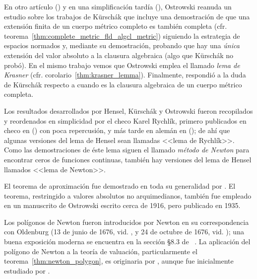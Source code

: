 \documentclass[teoria-numeros.tex]{subfiles}
\begin{document}
En otro artículo \cite{ostrowski:fragen} (\citeyear{ostrowski:fragen}) y en una simplificación tardía \cite{ostrowski:perfekte} (\citeyear{ostrowski:perfekte}),
Ostrowski reanuda un estudio sobre los trabajos de Kürschák que incluye una demostración de que una extensión finita de un cuerpo métrico completo
es también completa (cfr. teorema~\ref{thm:complete_metric_fld_algcl_metric}) siguiendo la estrategia de espacios normados y, mediante su demostración,
probando que hay una \textit{única} extensión del valor absoluto a la clausura algebraica (algo que Kürschák no probó).
En el mismo trabajo vemos que Ostrowski emplea el llamado \textit{lema de Krasner} (cfr. corolario~\ref{thm:krasner_lemma}).
Finalmente, respondió a la duda de Kürschák respecto a cuando es la clausura algebraica de un cuerpo métrico completa.

Los resultados desarrollados por Hensel, Kürschák y Ostrowski fueron recopilados y reordenados en simplicidad por el checo Karel Rychlík,
primero publicados en checo en \cite{rychlik:beitrag} (\citeyear{rychlik:beitrag}) con poca repercusión, y más tarde en alemán en
\cite{rychlik:bewertungstheorie} (\citeyear{rychlik:bewertungstheorie});
de ahí que algunas versiones del lema de Hensel sean llamadas <<lema de Rychlík>>.
Como las demostraciones de éste lema siguen el llamado \textit{método de Newton} para encontrar ceros de funciones continuas, también hay versiones
del lema de Hensel llamados <<lema de Newton>>.

El teorema de aproximación fue demostrado en toda su generalidad por \citet{artin:prod_form}.
El teorema, restringido a valores absolutos no arquimedianos, también fue empleado en un manuscrito de Ostrowski \cite{ostrowski:arthmetischen}
escrito cerca de 1916, pero publicado en 1935.

Los polígonos de Newton fueron introducidos por Newton en su correspondencia con Oldenburg (13 de junio de 1676,
vid. \cite[20-47]{newton:correspondence_ii}, y 24 de octubre de 1676, vid. \cite[162-164]{newton:correspondence_ii});
una buena exposición moderna se encuentra en la sección \S8.3 de \citeauthor{brieskorn:curves}~\cite[370-454]{brieskorn:curves}.
La aplicación del polígono de Newton a la teoría de valuación, particularmente el teorema~\ref{thm:newton_polygon},
es originaria por \citet{ostrowski:dirichletschen}, aunque fue inicialmente estudiado por \citet{rella:polynombereichen}.

\printbibliography[segment=\therefsegment, check=onlynew, notcategory=history, notcategory=historical, notcategory=other]
\bibbycategory[segment=\therefsegment, check=onlynew]
\end{document}

